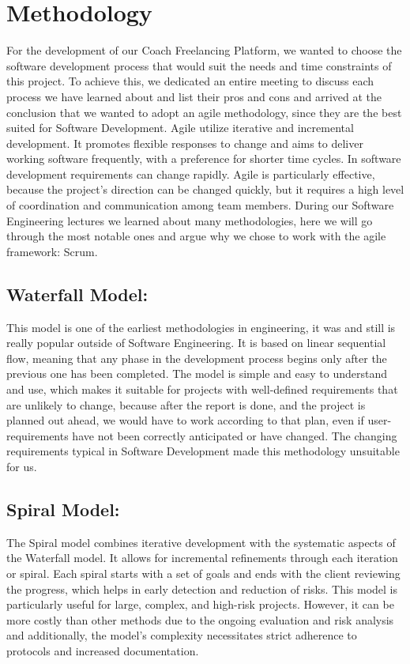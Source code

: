 \section{Methodology}

For the development of our Coach Freelancing Platform, we wanted to choose the software development process that would suit the needs and time constraints of this project. To achieve this, we dedicated an entire meeting to discuss each process we have learned about and list their pros and cons and arrived at the conclusion that we wanted to adopt an agile methodology, since they are the best suited for Software Development. Agile utilize iterative and incremental development. It promotes flexible responses to change and aims to deliver working software frequently, with a preference for shorter time cycles. In software development requirements can change rapidly. Agile is particularly effective, because the project's direction can be changed quickly, but it requires a high level of coordination and communication among team members.
During our Software Engineering lectures we learned about many methodologies, here we will go through the most notable ones and argue why we chose to work with the agile framework: Scrum.

\subsection{Waterfall Model:}
This model is one of the earliest methodologies in engineering, it was and still is really popular outside of Software Engineering. It is based on linear sequential flow, meaning that any phase in the development process begins only after the previous one has been completed. The model is simple and easy to understand and use, which makes it suitable for projects with well-defined requirements that are unlikely to change, because after the report is done, and the project is planned out ahead, we would have to work according to that plan, even if user-requirements have not been correctly anticipated or have changed. The changing requirements typical in Software Development made this methodology unsuitable for us.

\subsection{Spiral Model:}
The Spiral model combines iterative development with the systematic aspects of the Waterfall model. It allows for incremental refinements through each iteration or spiral. Each spiral starts with a set of goals and ends with the client reviewing the progress, which helps in early detection and reduction of risks. This model is particularly useful for large, complex, and high-risk projects. However, it can be more costly than other methods due to the ongoing evaluation and risk analysis and additionally, the model's complexity necessitates strict adherence to protocols and increased documentation.

